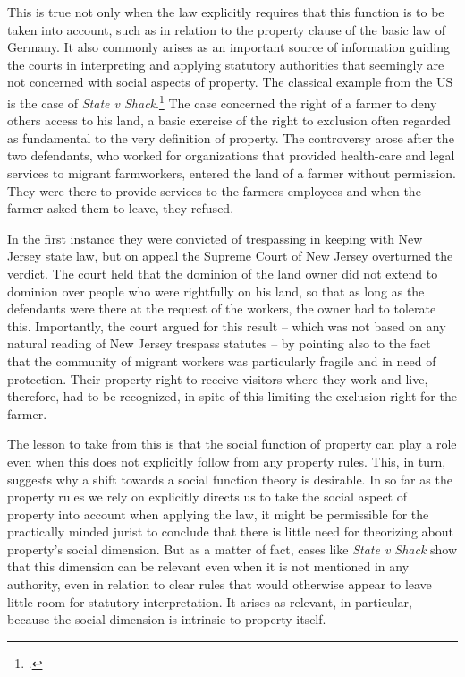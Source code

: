 This is true not only when the law explicitly requires that this function is to be taken into account, such as in relation to the property clause of the basic law of Germany. It also commonly arises as an important source of information guiding the courts in interpreting and applying statutory authorities that seemingly are not concerned with social aspects of property. The classical example from the US is the case of {\it State v Shack}.\footcite{shack71} The case concerned the right of a farmer to deny others access to his land, a basic exercise of the right to exclusion often regarded as fundamental to the very definition of property. The controversy arose after the two defendants, who worked for organizations that provided health-care and legal services to migrant farmworkers, entered the land of a farmer without permission. They were there to provide services to the farmers employees and when the farmer asked them to leave, they refused. 

In the first instance they were convicted of trespassing in keeping with New Jersey state law, but on appeal the Supreme Court of New Jersey overturned the verdict. The court held that the dominion of the land owner did not extend to dominion over people who were rightfully on his land, so that as long as the defendants were there at the request of the workers, the owner had to tolerate this. Importantly, the court argued for this result -- which was not based on any natural reading of New Jersey trespass statutes -- by pointing also to the fact that the community of migrant workers was particularly fragile and in need of protection. Their property right to receive visitors where they work and live, therefore, had to be recognized, in spite of this limiting the exclusion right for the farmer. 

The lesson to take from this is that the social function of property can play a role even when this does not explicitly follow from any property rules. This, in turn, suggests why a shift towards a social function theory is desirable. In so far as the property rules we rely 
on explicitly directs us to take the social aspect of property into account when applying the law, it might be permissible for the practically minded jurist to conclude that there is little need for theorizing about property's social dimension. But as a matter of fact, cases like {\it State v Shack} show that this dimension can be relevant even when it is not mentioned in any authority, even in relation to clear rules that would otherwise appear to leave little room for statutory interpretation. It arises as relevant, in particular, because the social dimension is intrinsic to property itself. 


